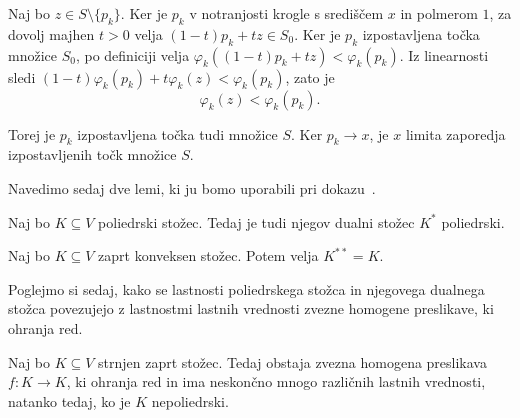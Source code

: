 \documentclass[mat2, tisk]{fmfdelo}
\begin{document}
\begin{dokaz}
Naj bo $z\in S\setminus\{p_k\}$.
Ker je $p_k$ v notranjosti krogle
s središčem $x$ in polmerom $1$,
za dovolj majhen $t>0$ velja $(1-t)p_k+tz\in S_0$.
Ker je $p_k$ izpostavljena točka množice $S_0$,
po definiciji velja
$\varphi_k((1-t)p_k+tz) < \varphi_k(p_k)$.
Iz linearnosti sledi
$(1-t)\varphi_k(p_k)+t\varphi_k(z) < \varphi_k(p_k)$,
zato je
\[
\varphi_k(z)<\varphi_k(p_k).
\]

Torej je $p_k$ izpostavljena točka
tudi množice $S$.
Ker $p_k\to x$, je $x$ limita
zaporedja izpostavljenih točk množice $S$.
\end{dokaz}

Navedimo sedaj dve lemi, ki ju bomo uporabili pri dokazu~\cite{fenchel1953}.

\begin{lema}\label{lema:dual_poliedrskega}
Naj bo $K\subseteq V$ poliedrski stožec.
Tedaj je tudi njegov dualni stožec $K^*$ poliedrski.
\end{lema}

\begin{lema}\label{lema:bipolarni_stozec}
Naj bo $K\subseteq V$ zaprt konveksen stožec.
Potem velja $K^{**}=K$.
\end{lema}

Poglejmo si sedaj, kako se lastnosti poliedrskega stožca in njegovega dualnega 
stožca povezujejo z lastnostmi lastnih vrednosti zvezne homogene preslikave, ki ohranja red.

\begin{izrek}\label{izrek:neskoncno_lastnih_vrednosti}
Naj bo $K\subseteq V$ strnjen zaprt stožec. Tedaj obstaja zvezna
homogena preslikava $f\colon K\longrightarrow K$, ki ohranja red in ima
neskončno mnogo različnih lastnih vrednosti, natanko tedaj, ko je $K$
nepoliedrski.
\end{izrek}
\end{document}
